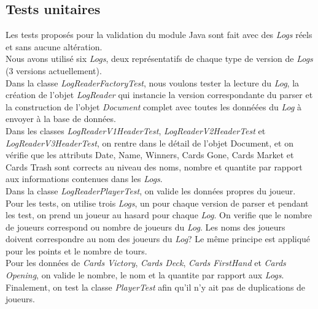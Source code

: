 \subsection{Tests unitaires}

Les tests proposés pour la validation du module Java sont fait avec des \textit{Logs} réels et sans aucune altération.\\
Nous avons utilisé six \textit{Logs}, deux représentatifs de chaque type de version de \textit{Logs} (3 versions actuellement). \\

Dans la classe \textit{LogReaderFactoryTest}, nous voulons tester la lecture du \textit{Log}, la création de l'objet \textit{LogReader} qui instancie la version correspondante du parser et la construction de l'objet \textit{Document} complet avec toutes les donnéées du \textit{Log} à envoyer à la base de données. \\

Dans les classes \textit{LogReaderV1HeaderTest}, \textit{LogReaderV2HeaderTest }et \textit{LogReaderV3HeaderTest}, on rentre dans le détail de l'objet Document, et on vérifie que les attributs Date, Name, Winners, Cards Gone, Cards Market et Cards Trash sont corrects au niveau des noms, nombre et quantite par rapport aux informations contenues dans les \textit{Logs}. \\

Dans la classe \textit{LogReaderPlayerTest}, on valide les données propres du joueur. Pour les tests, on utilise trois \textit{Logs}, un pour chaque version de parser et pendant les test, on prend un joueur au hasard pour chaque \textit{Log}. On verifie que le nombre de joueurs correspond ou nombre de joueurs du \textit{Log}. Les noms des joueurs doivent correspondre au nom des joueurs du \textit{Log}? Le même principe est appliqué pour les points et le nombre de tours. \\
Pour les données de \textit{Cards Victory}, \textit{Cards Deck}, \textit{Cards FirstHand} et \textit{Cards Opening}, on valide le nombre, le nom et la quantite par rapport aux \textit{Logs}. \\

Finalement, on test la classe \textit{PlayerTest} afin qu'il n'y ait pas de duplications de joueurs.

